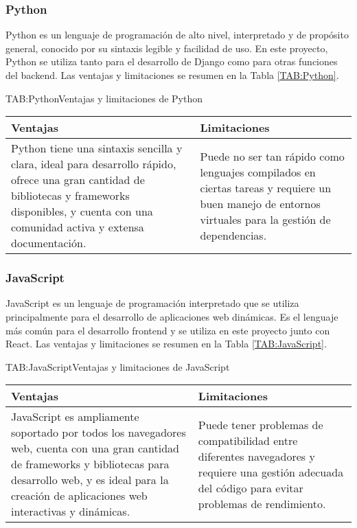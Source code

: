 \subsubsection{Python}

Python es un lenguaje de programación de alto nivel, interpretado y de propósito general, conocido por su sintaxis legible y facilidad de uso. En este proyecto, Python se utiliza tanto para el desarrollo de Django como para otras funciones del backend. Las ventajas y limitaciones se resumen en la Tabla \ref{TAB:Python}.

\begin{table}[Python]{TAB:Python}{Ventajas y limitaciones de Python}
  \begin{tabular}{|p{7cm}|p{7cm}|}
    \hline
    \textbf{Ventajas} & \textbf{Limitaciones} \\
    \hline
    Python tiene una sintaxis sencilla y clara, ideal para desarrollo rápido, ofrece una gran cantidad de bibliotecas y frameworks disponibles, y cuenta con una comunidad activa y extensa documentación. & Puede no ser tan rápido como lenguajes compilados en ciertas tareas y requiere un buen manejo de entornos virtuales para la gestión de dependencias. \\
    \hline
  \end{tabular}
\end{table}

\subsubsection{JavaScript}

JavaScript es un lenguaje de programación interpretado que se utiliza principalmente para el desarrollo de aplicaciones web dinámicas. Es el lenguaje más común para el desarrollo frontend y se utiliza en este proyecto junto con React. Las ventajas y limitaciones se resumen en la Tabla \ref{TAB:JavaScript}.

\begin{table}[JavaScript]{TAB:JavaScript}{Ventajas y limitaciones de JavaScript}
  \begin{tabular}{|p{7cm}|p{7cm}|}
    \hline
    \textbf{Ventajas} & \textbf{Limitaciones} \\
    \hline
    JavaScript es ampliamente soportado por todos los navegadores web, cuenta con una gran cantidad de frameworks y bibliotecas para desarrollo web, y es ideal para la creación de aplicaciones web interactivas y dinámicas. & Puede tener problemas de compatibilidad entre diferentes navegadores y requiere una gestión adecuada del código para evitar problemas de rendimiento. \\
    \hline
  \end{tabular}
\end{table}

